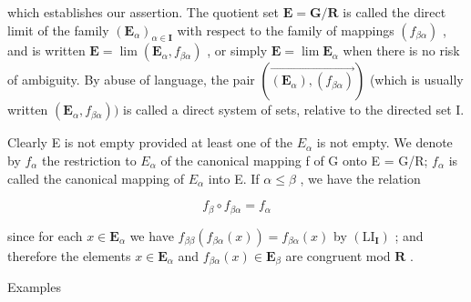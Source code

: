 which establishes our assertion. The quotient set \(\mathbf{E} = \mathbf{G} / \mathbf{R}\) is called the direct limit of the family \((\mathbf{E}_{\alpha})_{\alpha \in \mathbf{I}}\) with respect to the family of mappings \((f_{\beta \alpha})\) , and is written \(\mathbf{E} = \lim (\mathbf{E}_{\alpha}, f_{\beta \alpha})\) , or simply \(\mathbf{E} = \lim \mathbf{E}_{\alpha}\) when there is no risk of ambiguity. By abuse of language, the pair \((\overrightarrow{(\mathbf{E}_{\alpha}), (f_{\beta \alpha})})\) (which is usually written \((\mathbf{E}_{\alpha}, f_{\beta \alpha}))\) is called a direct system of sets, relative to the directed set I.

Clearly E is not empty provided at least one of the \(E_{\alpha}\) is not empty. We denote by \(f_{\alpha}\) the restriction to \(E_{\alpha}\) of the canonical mapping f of G onto E = G/R; \(f_{\alpha}\) is called the canonical mapping of \(E_{\alpha}\) into E. If \(\alpha \leqslant \beta\) , we have the relation

\[
f _ {\beta} \circ f _ {\beta \alpha} = f _ {\alpha}\tag{22}
\]

since for each \(x \in \mathbf{E}_{\alpha}\) we have \(f_{\beta \beta}(f_{\beta \alpha}(x)) = f_{\beta \alpha}(x)\) by \((\mathrm{LI}_{\mathbf{I}})\) ; and therefore the elements \(x \in \mathbf{E}_{\alpha}\) and \(f_{\beta \alpha}(x) \in \mathbf{E}_{\beta}\) are congruent mod \(\mathbf{R}\) .

Examples

